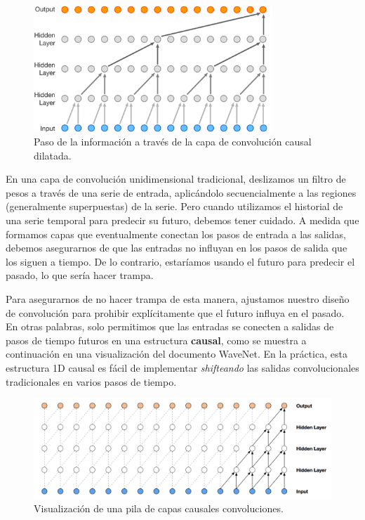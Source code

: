 \documentclass[a4paper,12pt]{article}
\begin{document}
\begin{figure}[H]
	\begin{center}				
	\includegraphics[width=0.8\textwidth]{causal-conv.png}
  	\caption{Paso de la información a través de la capa de convolución causal dilatada.}
  	\label{fig:causal-conv}
  	\end{center}
\end{figure}

En una capa de convolución unidimensional tradicional, deslizamos un filtro de pesos a través de una serie de entrada, aplicándolo secuencialmente a las regiones (generalmente superpuestas) de la serie. Pero cuando utilizamos el historial de una serie temporal para predecir su futuro, debemos tener cuidado. A medida que formamos capas que eventualmente conectan los pasos de entrada a las salidas, debemos asegurarnos de que las entradas no influyan en los pasos de salida que los siguen a tiempo. De lo contrario, estaríamos usando el futuro para predecir el pasado, lo que sería hacer trampa.

Para asegurarnos de no hacer trampa de esta manera, ajustamos nuestro diseño de convolución para prohibir explícitamente que el futuro influya en el pasado. En otras palabras, solo permitimos que las entradas se conecten a salidas de pasos de tiempo futuros en una estructura \textbf{causal}, como se muestra a continuación en una visualización del documento WaveNet. En la práctica, esta estructura 1D causal es fácil de implementar \textit{shifteando} las salidas convolucionales tradicionales en varios pasos de tiempo.

\begin{figure}[H]
	\begin{center}				
	\includegraphics[width=1\textwidth]{stackcausal-conv.png}
  	\caption{Visualización de una pila de capas causales convoluciones.}
  	\label{fig:stackcausal-conv}
  	\end{center}
\end{figure}
\end{document}
